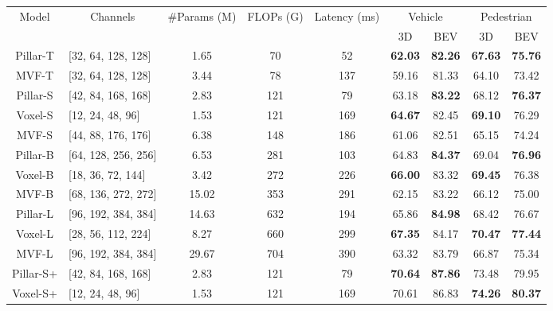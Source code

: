 \documentclass[10pt,twocolumn,letterpaper]{article}
\begin{document}
\begin{table*}[t]
\centering
\begin{tabular}{c|lccc|cc|cc}
\hline
\multirow{2}{*}{Model} & \multicolumn{1}{c}{\multirow{2}{*}{Channels}} & \multirow{2}{*}{\#Params (M)} & \multirow{2}{*}{FLOPs (G)} & \multirow{2}{*}{Latency (ms)}& \multicolumn{2}{c|}{Vehicle} & \multicolumn{2}{c}{Pedestrian} \\ \cline{6-9} 
                        &                          &        &      &                & 3D           & BEV           & 3D             & BEV           \\ \hline
  Pillar-T       &   [32, 64, 128, 128]                        &       1.65    & 70                   &          52    &  \textbf{62.03}        &     \textbf{82.26}   &     \textbf{67.63}      &     \textbf{75.76}       \\  
  MVF-T & [32, 64, 128, 128] & 3.44 & 78 & 137 & 59.16 & 81.33 & 64.10 & 73.42 \\
   \hline 
  Pillar-S & [42, 84, 168, 168]  & 2.83  & 121 & 79 & 63.18 & \textbf{83.22} & 68.12 & \textbf{76.37} \\
 Voxel-S      &     [12, 24, 48, 96]     &       1.53          & 121             &      169        &     \textbf{64.67}      &    82.45      &     \textbf{69.10}      &     76.29     \\ 
 MVF-S & [44, 88, 176, 176] & 6.38 & 148 & 186 & 61.06 & 82.51 & 65.15 &74.24  \\
  \hline 
  Pillar-B & [64, 128, 256, 256]  & 6.53 & 281 &  103 & 64.83 & \textbf{84.37 }&  69.04 & \textbf{76.96}\\ 
  Voxel-B & [18, 36, 72, 144]  & 3.42 & 272 & 226 &  \textbf{66.00} & 83.32 &  \textbf{69.45} & 76.38\\
  MVF-B & [68, 136, 272, 272] & 15.02 & 353 & 291 & 62.15 & 83.22 & 66.12 & 75.00  \\ \hline
  Pillar-L & [96, 192, 384, 384] & 14.63 & 632 & 194 & 65.86 & \textbf{84.98} & 68.42 & 76.67 \\ 
  Voxel-L & [28, 56, 112, 224]  &8.27 &  660  & 299 &  \textbf{67.35} & 84.17 & \textbf{70.47} & \textbf{77.44} \\ 
 MVF-L & [96, 192, 384, 384] & 29.67 & 704 & 390 & 63.32 & 83.79 & 66.87 &  75.34   \\ \hline
\rowcolor[HTML]{EFEFEF} Pillar-S+  & [42, 84, 168, 168]  & 2.83  & 121 & 79 &  \textbf{70.64} & \textbf{87.86} & 73.48 & 79.95 \\  
\rowcolor[HTML]{EFEFEF} Voxel-S+  & [12, 24, 48, 96]  & 1.53  & 121 & 169 &  70.61 & 86.83 & \textbf{74.26} & \textbf{80.37} \\ 

\end{tabular}
\end{table*}
\end{document}

